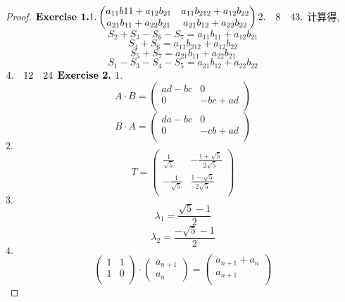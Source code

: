 \documentclass[11pt]{ctexart}
\theoremstyle{definition}
\numberwithin{equation}{section}
\begin{document}
\begin{proof}
    $
     \textbf{Exercise 1.}\\
    1.\begin{pmatrix}
        a_{11}b{11}+a_{12}b_{21} & a_{11}b_{212}+a_{12}b_{22} \\
        a_{21}b_{11}+a_{22}b_{21} & a_{21}b_{12}+a_{22}b_{22} \\
    \end{pmatrix}
    \\
    2.\quad 8\quad 4\\
    3. 
    $ 
    计算得,
    $$S_2+S_3-S_6-S_7=a_{11}b_{11}+a_{12}b_{21}$$
    $$S_4+S_6= a_{11}b_{212}+a_{12}b_{22}$$
    $$ S_5+S_7=a_{21}b_{11}+a_{22}b_{21}$$
    $$S_1-S_3-S_4-S_5=a_{21}b_{12}+a_{22}b_{22}$$
    $\\
    4.\quad 12 \quad 24 \\
    \\$
    \newline
    $ \textbf{Exercise 2.}\\$
    1.
    $$ A\cdot B=
    \begin{pmatrix}
        ad-bc & 0 \\
        0 & -bc+ad \\
    \end{pmatrix}  $$  
    $$ B\cdot A=
    \begin{pmatrix}
        da-bc & 0 \\
        0 & -cb+ad \\
    \end{pmatrix}  $$ 
    $2.$
    $$T=
    \begin{pmatrix}
        \frac{1}{\sqrt 5}&-\frac{1+\sqrt 5}{2\sqrt 5}\\
        -\frac{1}{\sqrt 5}&\frac{1-\sqrt 5}{2\sqrt 5}\\
    \end{pmatrix}
    $$
    $3.$
    $$\lambda_1=\frac{\sqrt 5-1}{2}$$
    $$\lambda_2=\frac{-\sqrt 5 -1}{2}$$
    $4.$
    $$\begin{pmatrix}
        1&1\\1&0\\
    \end{pmatrix}
    \cdot 
    \begin{pmatrix}
        a_{n+1}\\a_n
    \end{pmatrix}
    =
    \begin{pmatrix}
        a_{n+1}+a_n\\a_{n+1}\\
    \end{pmatrix}
$$
\end{proof}
\end{document}
